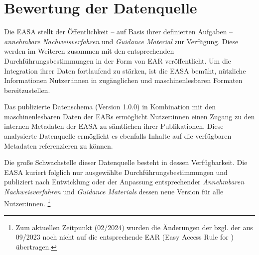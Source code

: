     \section{Bewertung der Datenquelle}

    Die \acf{EASA} stellt der Öffentlichkeit -- auf Basis ihrer definierten Aufgaben -- \textit{annehmbare Nachweisverfahren} und \textit{Guidance Material} zur Verfügung.
    Diese werden im Weiteren zusammen mit den entsprechenden Durchführungsbestimmungen in der Form von \acf{EAR} veröffentlicht. 
    Um die Integration ihrer Daten fortlaufend zu stärken, ist die \ac{EASA} bemüht, nützliche Informationen Nutzer:innen in zugänglichen und maschinenlesbaren Formaten bereitzustellen. 

    Das publizierte Datenschema (Version 1.0.0) in Kombination mit den maschinenlesbaren Daten der \acp{EAR} ermöglicht Nutzer:innen einen Zugang zu den internen Metadaten der \ac{EASA} zu sämtlichen ihrer Publikationen.
    Diese analysierte Datenquelle ermöglicht es ebenfalls Inhalte auf die verfügbaren Metadaten referenzieren zu können.


    Die große Schwachstelle dieser Datenquelle besteht in dessen Verfügbarkeit.
    Die \ac{EASA} kuriert folglich nur ausgewählte Durchführungsbestimmungen und publiziert nach Entwicklung oder der Anpassung entsprechender \textit{Annehmbaren Nachweisverfahren} und \textit{Guidance Materials} dessen neue Version für alle Nutzer:innen.
    \footnote{Zum aktuellen Zeitpunkt (02/2024) wurden die Änderungen der  bzgl. der  aus 09/2023 noch nicht auf die entsprechende \ac{EAR} (Easy Access Rule for \atmans) übertragen.}
     